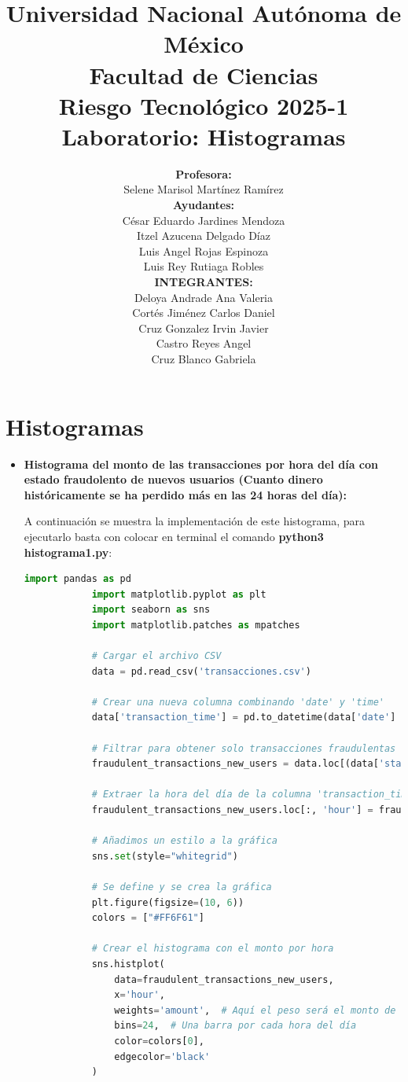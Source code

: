 \documentclass{article}
\title{Universidad Nacional Autónoma de México \\\bigskip Facultad de Ciencias \\\bigskip Riesgo Tecnológico 2025-1 \\\bigskip \textbf{Laboratorio: Histogramas}}
\author{\textbf{Profesora:} \\\bigskip Selene Marisol Martínez Ramírez \\\bigskip \textbf{Ayudantes:} \\\bigskip  César Eduardo Jardines Mendoza \\\bigskip Itzel Azucena Delgado Díaz \\\bigskip Luis Angel Rojas Espinoza \\\bigskip Luis Rey Rutiaga Robles \\\bigskip \textbf{INTEGRANTES:} \\\bigskip Deloya Andrade Ana Valeria \\\bigskip Cortés Jiménez Carlos Daniel \\\bigskip Cruz Gonzalez Irvin Javier \\\bigskip Castro Reyes Angel \\\bigskip Cruz Blanco Gabriela}
\begin{document}
\maketitle

\newpage
 
\section{Histogramas}

\begin{itemize}
    \item \textbf{Histograma del monto de las transacciones por hora del día con estado fraudolento de nuevos usuarios (Cuanto dinero históricamente se ha perdido más en las 24 horas del día):}

        A continuación se muestra la implementación de este histograma, para ejecutarlo basta con colocar en terminal el comando \textbf{python3 histograma1.py}:

        \begin{lstlisting}[language=Python, caption=Implementación del Histograma del monto de transacciones por hora del día]
            import pandas as pd
            import matplotlib.pyplot as plt
            import seaborn as sns
            import matplotlib.patches as mpatches
            
            # Cargar el archivo CSV
            data = pd.read_csv('transacciones.csv')
            
            # Crear una nueva columna combinando 'date' y 'time'
            data['transaction_time'] = pd.to_datetime(data['date'] + ' ' + data['time'], format='%d/%m/%Y %H:%M')
            
            # Filtrar para obtener solo transacciones fraudulentas de nuevos usuarios
            fraudulent_transactions_new_users = data.loc[(data['status'] == 'fraudulent') & (data['new_user'] == True)].copy()
            
            # Extraer la hora del día de la columna 'transaction_time'
            fraudulent_transactions_new_users.loc[:, 'hour'] = fraudulent_transactions_new_users['transaction_time'].dt.hour
            
            # Añadimos un estilo a la gráfica
            sns.set(style="whitegrid")
            
            # Se define y se crea la gráfica
            plt.figure(figsize=(10, 6))
            colors = ["#FF6F61"]
            
            # Crear el histograma con el monto por hora
            sns.histplot(
                data=fraudulent_transactions_new_users,
                x='hour', 
                weights='amount',  # Aquí el peso será el monto de la transacción
                bins=24,  # Una barra por cada hora del día
                color=colors[0],
                edgecolor='black'
            )
            

\end{lstlisting}
\end{itemize}
\end{document}
